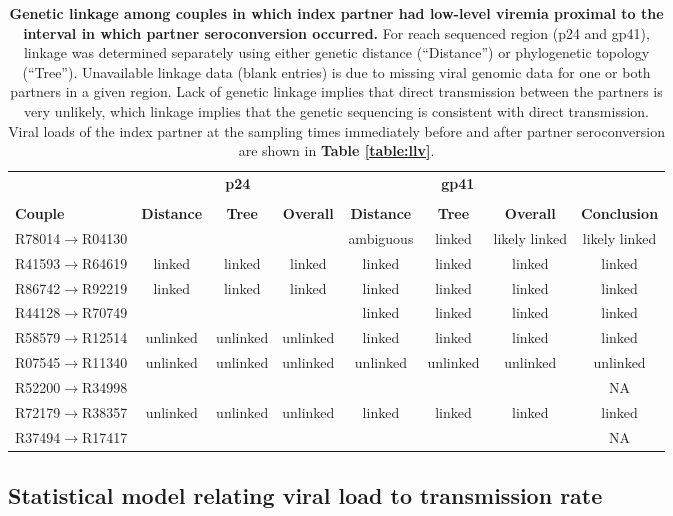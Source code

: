 \documentclass{article}[11pt]
\begin{document}
\begin{table}[!h]
\caption{\textbf{Genetic linkage among couples in which index partner had low-level viremia proximal to the interval in which partner seroconversion occurred.} For reach sequenced region (p24 and gp41), linkage was determined separately using either genetic distance (``Distance'') or phylogenetic topology (``Tree''). Unavailable linkage data (blank entries) is due to missing viral genomic data for one or both partners in a given region. Lack of genetic linkage implies that direct transmission between the partners is very unlikely, which linkage implies that the genetic sequencing is consistent with direct transmission. Viral loads of the index partner at the sampling times immediately before and after partner seroconversion are shown in \textbf{Table \ref{table:llv}}.}
\begin{tabular}{lccccccc}
\toprule
&\multicolumn{3}{c}{\textbf{p24}}&\multicolumn{3}{c}{\textbf{gp41}}&\\
\cmidrule(lr){2-4}\cmidrule(lr){5-7}&\\
\textbf{Couple}&\textbf{Distance}&\textbf{Tree} & \textbf{Overall} & \textbf{Distance}&\textbf{Tree} & \textbf{Overall} & \textbf{Conclusion} \\
\midrule
R78014$\rightarrow$R04130&&&& ambiguous & linked & likely linked & likely linked\\
R41593$\rightarrow$R64619& linked & linked & linked & linked & linked & linked & linked\\
R86742$\rightarrow$R92219& linked & linked & linked & linked & linked & linked & linked\\
R44128$\rightarrow$R70749&&&&linked&linked&linked&linked\\
R58579$\rightarrow$R12514& unlinked & unlinked & unlinked & linked & linked & linked & linked\\
R07545$\rightarrow$R11340& unlinked & unlinked & unlinked & unlinked & unlinked & unlinked & unlinked\\
R52200$\rightarrow$R34998&&&&&&& NA\\
R72179$\rightarrow$R38357& unlinked & unlinked & unlinked & linked & linked & linked & linked\\
R37494$\rightarrow$R17417&&&&&&& NA\\
\bottomrule
\end{tabular}
\label{table:linkage}
\end{table}

\clearpage

\subsection*{Statistical model relating viral load to transmission rate}
\end{document}
